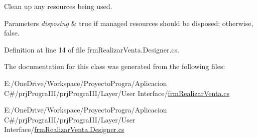 Clean up any resources being used. 


\begin{DoxyParams}{Parameters}
{\em disposing} & true if managed resources should be disposed; otherwise, false.\\
\hline
\end{DoxyParams}


Definition at line 14 of file frm\+Realizar\+Venta.\+Designer.\+cs.



The documentation for this class was generated from the following files\+:\begin{DoxyCompactItemize}
\item 
E\+:/\+One\+Drive/\+Workspace/\+Proyecto\+Progra/\+Aplicacion C\#/prj\+Progra\+I\+I\+I/prj\+Progra\+I\+I\+I/\+Layer/\+User Interface/\hyperlink{frm_realizar_venta_8cs}{frm\+Realizar\+Venta.\+cs}\item 
E\+:/\+One\+Drive/\+Workspace/\+Proyecto\+Progra/\+Aplicacion C\#/prj\+Progra\+I\+I\+I/prj\+Progra\+I\+I\+I/\+Layer/\+User Interface/\hyperlink{frm_realizar_venta_8_designer_8cs}{frm\+Realizar\+Venta.\+Designer.\+cs}\end{DoxyCompactItemize}
